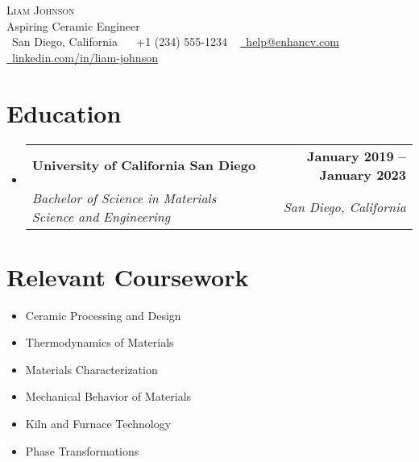 \documentclass[letterpaper,11pt]{article}
\makeatletter
\newcommand{\resumeSubheading}[4]{
  \vspace{-2pt}\item
    \begin{tabular*}{1.0\textwidth}[t]{l@{\extracolsep{\fill}}r}
      \textbf{#1} & \textbf{\small #2} \\
      \textit{\small#3} & \textit{\small #4} \\
    \end{tabular*}\vspace{-7pt}
}
\newcommand{\resumeSubHeadingListStart}{\begin{itemize}[leftmargin=0.0in, label={}]}
\newcommand{\resumeSubHeadingListEnd}{\end{itemize}}
\makeatother
\begin{document}
\begin{center}
    {\Huge \scshape Liam Johnson} \\ \vspace{1pt}
    \large{Aspiring Ceramic Engineer} \\ \vspace{4pt}
    \small \raisebox{-0.1\height}\faMapMarkerAlt\ San Diego, California ~ \raisebox{-0.1\height}\faPhone\ +1 (234) 555-1234 ~ \href{mailto:help@enhancv.com}{\raisebox{-0.2\height}\faEnvelope\  \underline{help@enhancv.com}} ~ 
    \href{https://linkedin.com/in/liam-johnson}{\raisebox{-0.2\height}\faLinkedin\ \underline{linkedin.com/in/liam-johnson}}
    \vspace{-8pt}
\end{center}

\section{Education}
  \resumeSubHeadingListStart
    \resumeSubheading
      {University of California San Diego}{January 2019 -- January 2023}
      {Bachelor of Science in Materials Science and Engineering}{San Diego, California}
  \resumeSubHeadingListEnd

\section{Relevant Coursework}
    \begin{multicols}{3}
        \begin{itemize}[itemsep=-5pt, parsep=3pt]
            \item\small Ceramic Processing and Design
            \item\small Thermodynamics of Materials
            \item\small Materials Characterization
            \item\small Mechanical Behavior of Materials
            \item\small Kiln and Furnace Technology
            \item\small Phase Transformations
        \end{itemize}
    \end{multicols}
    \vspace*{2.0\multicolsep}
    
\end{document}
